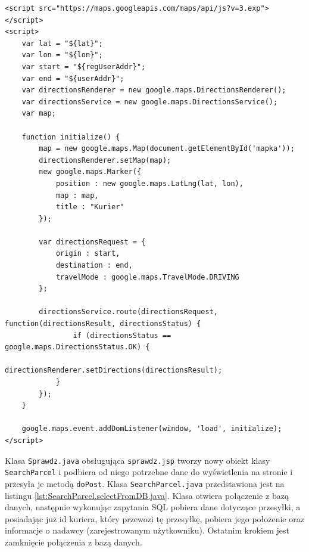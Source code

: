 \documentclass[eng,printmode,oneside]{mgr}
\begin{document}
\begin{lstlisting}[caption=Kod JavaScript'owy pobierający mapę z
serwera Google,label=lst:maps.JS] 
<script src="https://maps.googleapis.com/maps/api/js?v=3.exp"></script> 
<script>
	var lat = "${lat}";
	var lon = "${lon}";
	var start = "${regUserAddr}";
	var end = "${userAddr}";
	var directionsRenderer = new google.maps.DirectionsRenderer();
	var directionsService = new google.maps.DirectionsService();
	var map;

	function initialize() {
		map = new google.maps.Map(document.getElementById('mapka'));
		directionsRenderer.setMap(map);
		new google.maps.Marker({
			position : new google.maps.LatLng(lat, lon),
			map : map,
			title : "Kurier"
		});
		
		var directionsRequest = {
			origin : start,
			destination : end,
			travelMode : google.maps.TravelMode.DRIVING
		};
		
		directionsService.route(directionsRequest, function(directionsResult, directionsStatus) {
				if (directionsStatus == google.maps.DirectionsStatus.OK) {
					directionsRenderer.setDirections(directionsResult);
			}
		});
	}
	
	google.maps.event.addDomListener(window, 'load', initialize);
</script>
\end{lstlisting}

Klasa \texttt{Sprawdz.java} obsługująca \texttt{sprawdz.jsp} tworzy nowy obiekt
klasy \texttt{SearchParcel} i podbiera od niego potrzebne dane do wyświetlenia
na stronie i przesyła je metodą \texttt{doPost}. Klasa
\texttt{SearchParcel.java} przedstawiona jest na listingu
\ref{lst:SearchParcel.selectFromDB.java}. Klasa otwiera połączenie z bazą danych, 
następnie wykonując zapytania SQL pobiera dane dotyczące przesyłki, a
posiadając już id kuriera, który przewozi tę przesyłkę, pobiera jego położenie
oraz informacje o nadawcy (zarejestrowanym użytkowniku). Ostatnim
krokiem jest zamknięcie połączenia z bazą danych.
\end{document}
